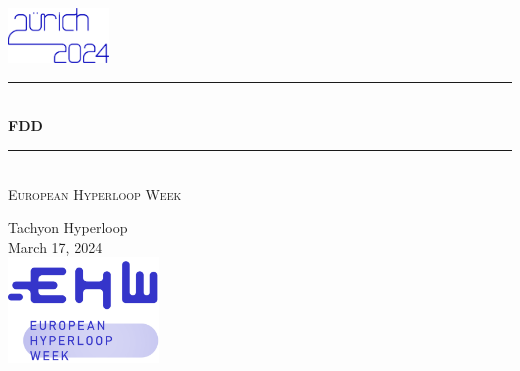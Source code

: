 \begin{titlepage}
    \newcommand{\HRule}{\rule{\linewidth}{0.5mm}}
    \center 
     
    \includegraphics[width=0.2\textwidth]{backgroundimages/ZurichImage.png}\\[1cm]
    
    {\color{ehwBlue}\HRule} \\[0.8cm]
    {\fontsize{36}{42}\selectfont \bfseries \textcolor{ehwBlue}{{FDD}}}\\[0.7cm]		%
    {\color{ehwBlue}\HRule} \\[2cm]
    \textsc{\LARGE\textcolor{ehwBlue}{ European Hyperloop Week}}\\[1cm]
    \large
    
    
    \textcolor{ehwBlue}{Tachyon Hyperloop}\\[1.5cm]
    \huge \textcolor{ehwBlue}{March 17, 2024}\\[4cm]
    \includegraphics[width=0.3\textwidth]{backgroundimages/LogoBlue.png}\\[1cm] 	%
    \vfill 
\end{titlepage}
    